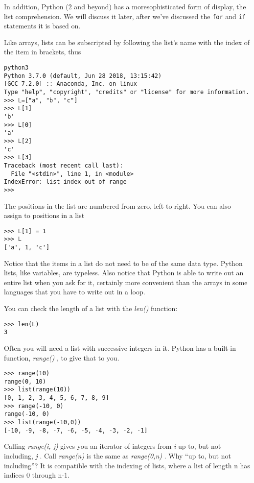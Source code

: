 In addition, Python (2 and beyond) has a moresophisticated form of display, the list comprehension. 
We will discuss it later, after we've discussed the \texttt{for} and \texttt{if}
statements it is based on.

Like arrays, lists can be subscripted by following the list's name with the index of the item in
brackets, thus

\begin{verbatim}
python3
Python 3.7.0 (default, Jun 28 2018, 13:15:42) 
[GCC 7.2.0] :: Anaconda, Inc. on linux
Type "help", "copyright", "credits" or "license" for more information.
>>> L=["a", "b", "c"]
>>> L[1]
'b'
>>> L[0]
'a'
>>> L[2]
'c'
>>> L[3]
Traceback (most recent call last):
  File "<stdin>", line 1, in <module>
IndexError: list index out of range
>>> 
\end{verbatim}

The positions in the list are numbered from zero, left to right. You can also assign to positions in a
list

\begin{verbatim}
>>> L[1] = 1
>>> L
['a', 1, 'c']
\end{verbatim}

Notice that the items in a list do
not need to be of the same data type. Python lists, like variables, are
typeless. Also notice that Python is able to write out an entire list
when you ask for it, certainly more convenient than the arrays in some
languages that you have to write out in a loop.

You can check the length of a list
with the \emph{len()} function:

\begin{verbatim}
>>> len(L)
3
\end{verbatim}

Often you will need a list with
successive integers in it. Python has a built-in function,
\emph{range()} , to give that to you.

\begin{verbatim}
>>> range(10)
range(0, 10)
>>> list(range(10))
[0, 1, 2, 3, 4, 5, 6, 7, 8, 9]
>>> range(-10, 0)
range(-10, 0)
>>> list(range(-10,0))
[-10, -9, -8, -7, -6, -5, -4, -3, -2, -1]
\end{verbatim}


Calling \emph{range(i, j)} gives you an iterator of integers 
from \emph{i} up to, but not including,
\emph{j} . Call \emph{range(n)} is the same as \emph{range(0,n)} . Why
``up to, but not including''? It is compatible with the indexing of
lists, where a list of length n has indices 0 through n-1.

